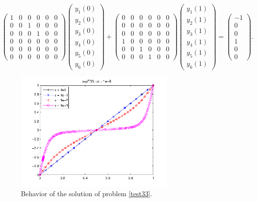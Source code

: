 \documentclass[<options>]{article}
\begin{document}
\begin{equation*}
\left(
  \begin{array}{cccccc}
    1 & 0 & 0 & 0&0 & 0\\
    0 & 0 & 1 & 0&0 & 0\\
    0 & 0 & 0 & 1&0 & 0\\
    0 & 0 & 0 & 0&0 & 0\\
    0 & 0 & 0 & 0&0 & 0\\
    0 & 0 & 0 & 0&0 & 0 \end{array}
\right)
\left(\begin{array}{c}
y_{1}(0)\\
y_{2}(0)\\
y_{3}(0)\\
y_{4}(0)\\
y_{5}(0)\\
y_{6}(0)
\end{array}\right)
+
\left(
  \begin{array}{cccccc}
    0 & 0 & 0 & 0&0 & 0\\ 0 & 0 & 0 & 0&0 & 0\\ 0 & 0 & 0 & 0&0 & 0\\ 1 & 0 & 0 & 0&0 & 0\\ 0 & 0 & 1 & 0&0 & 0\\
    0 & 0 & 0 & 1&0 & 0 \end{array}
\right)
\left(\begin{array}{c}
y_{1}(1)\\
y_{2}(1)\\
y_{3}(1)\\
y_{4}(1) \\
y_{5}(1) \\
y_{6}(1)
\end{array}\right)=\left(\begin{array}{c}
-1 \\
0 \\
0\\
1\\
0\\
0
\end{array}\right).
\end{equation*}

\begin{figure}[htb]
\centerline{\includegraphics[height=6cm]{Prob33}}
\caption{Behavior of the solution of problem \ref{test33}.}
\end{figure}
\end{document}
